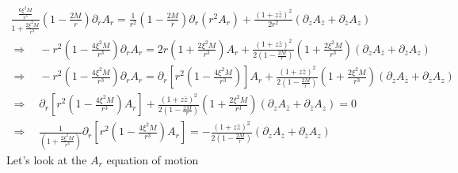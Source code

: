 \documentclass[12pt]{article}
\def\nn{\nonumber}
\begin{document}
\begin{gather}
\frac{\frac{6 \xi^{2} M}{r^{3}} }{1 + \frac{2 \xi^{2} M}{r^{3}}}
(1 - \frac{2 M}{r})
\partial_{r} A_{r}
=
\frac{1}{r^{2}}
(1 - \frac{2 M}{r})
\partial_{r}(r^{2} A_{r})
+
\frac{(1 + z \bar{z})^{2}}{2 r^{2}}
(\partial_{z} A_{\bar{z}} + \partial_{\bar{z}} A_{z})
\nn \\
\Rightarrow
\quad
- r^{2} (1 - \frac{4 \xi^{2} M}{r^{3}})
\partial_{r} A_{r}
=
2 r
(1 + \frac{2 \xi^{2} M}{r^{3}})
A_{r}
+
\frac{(1 + z \bar{z})^{2}}{2 (1 - \frac{2 M}{r})}
(1 + \frac{2 \xi^{2} M}{r^{3}})
(\partial_{z} A_{\bar{z}} + \partial_{\bar{z}} A_{z})
\nn \\
\Rightarrow
\quad
- r^{2} (1 - \frac{4 \xi^{2} M}{r^{3}})
\partial_{r} A_{r}
=
\partial_{r}
\left[
r^{2}
(1 - \frac{4 \xi^{2} M}{r^{3}})
\right]
A_{r}
+
\frac{(1 + z \bar{z})^{2}}{2 (1 - \frac{2 M}{r})}
(1 + \frac{2 \xi^{2} M}{r^{3}})
(\partial_{z} A_{\bar{z}} + \partial_{\bar{z}} A_{z})
\nn \\
\Rightarrow
\quad
\partial_{r}
\left[
r^{2}
(1 - \frac{4 \xi^{2} M}{r^{3}})
A_{r}
\right]
+
\frac{(1 + z \bar{z})^{2}}{2 (1 - \frac{2 M}{r})}
(1 + \frac{2 \xi^{2} M}{r^{3}})
(\partial_{z} A_{\bar{z}} + \partial_{\bar{z}} A_{z})
=0
\nn \\
\Rightarrow
\quad
\frac{1}{(1 + \frac{2 \xi^{2} M}{r^{3}})}
\partial_{r}
\left[
r^{2}
(1 - \frac{4 \xi^{2} M}{r^{3}})
A_{r}
\right]
=
-\frac{(1 + z \bar{z})^{2}}{2 (1 - \frac{2 M}{r})}
(\partial_{z} A_{\bar{z}} + \partial_{\bar{z}} A_{z})
\end{gather}
Let's look at the $A_{r}$ equation of motion
\end{document}
